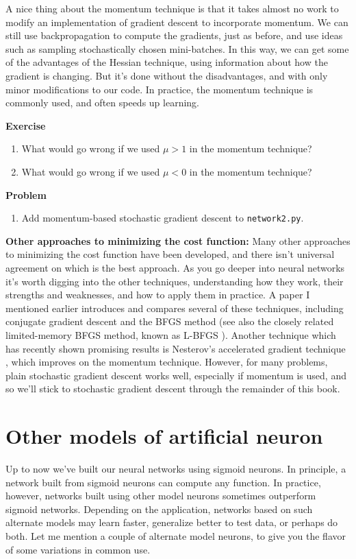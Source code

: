 A nice thing about the momentum technique is that it takes almost no work to modify an implementation of gradient descent to incorporate momentum. We can still use backpropagation to compute the gradients, just as before, and use ideas such as sampling stochastically chosen mini-batches. In this way, we can get some of the advantages of the Hessian technique, using information about how the gradient is changing. But it's done without the disadvantages, and with only minor modifications to our code. In practice, the momentum technique is commonly used, and often speeds up learning.

\textbf{Exercise}

\begin{enumerate}
\item What would go wrong if we used $\mu > 1$ in the momentum technique?
\item What would go wrong if we used $\mu < 0$  in the momentum technique? 

\end{enumerate}

\textbf{Problem}

\begin{enumerate}
\item Add momentum-based stochastic gradient descent to \lstinline{network2.py}. 
\end{enumerate}

\textbf{Other approaches to minimizing the cost function:} Many other approaches to minimizing the cost function have been developed, and there isn't universal agreement on which is the best approach. As you go deeper into neural networks it's worth digging into the other techniques, understanding how they work, their strengths and weaknesses, and how to apply them in practice. A paper I mentioned earlier \cite{LeCun:1998:EB:645754.668382} introduces and compares several of these techniques, including conjugate gradient descent and the BFGS method (see also the closely related limited-memory BFGS method, known as L-BFGS \cite{WikiPediaLimitedmemoryBFGS2019}). Another technique which has recently shown promising results is Nesterov's accelerated gradient technique \cite{Sutskever:2013:IIM:3042817.3043064}, which improves on the momentum technique. However, for many problems, plain stochastic gradient descent works well, especially if momentum is used, and so we'll stick to stochastic gradient descent through the remainder of this book.

\section{Other models of artificial neuron}
\label{sec:Othermodelsofartificialneuron}
Up to now we've built our neural networks using sigmoid neurons. In principle, a network built from sigmoid neurons can compute any function. In practice, however, networks built using other model neurons sometimes outperform sigmoid networks. Depending on the application, networks based on such alternate models may learn faster, generalize better to test data, or perhaps do both. Let me mention a couple of alternate model neurons, to give you the flavor of some variations in common use.

